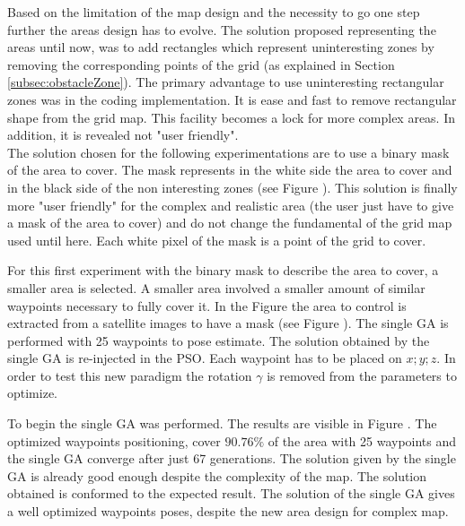 Based on the limitation of the map design and the necessity to go one step further the areas design has to evolve.
The solution proposed representing the areas until now, was to add rectangles which represent uninteresting zones by removing the corresponding points of the grid (as explained in Section \ref{subsec:obstacleZone}). The primary advantage to use uninteresting  rectangular zones was in the coding implementation. It is ease and fast to remove rectangular shape from the grid map. 
This facility becomes a lock for more complex areas. In addition, it is revealed not "user friendly".\\
 The solution chosen for the following experimentations are to use a binary mask of the area to cover. The mask represents in the white side the area to cover and in the black side of the non interesting zones (see Figure  ). This solution is finally more "user friendly" for the complex and realistic area (the user just have to give a mask of the area to cover) and do not change the fundamental of the grid map used until here. Each white pixel of the mask is a point of the grid to cover.  
 

For this first experiment with the binary mask to describe the area to cover, a smaller area is selected. A smaller area involved a smaller amount of similar waypoints necessary to fully cover it. In the Figure  the area to control is extracted from a satellite images to have a mask (see Figure ). The single GA is performed  with 25 waypoints to pose estimate. The solution obtained by the single GA is re-injected in the PSO. Each waypoint has to be placed on $x; y; z$. In order to test this new paradigm the rotation $\gamma$ is removed from the parameters to optimize.

 To begin the single GA was performed. The results are visible in Figure . The optimized waypoints positioning, cover $90.76\%$ of the area with 25 waypoints and the single GA converge after just 67 generations. The solution given by the single GA is already good enough despite the complexity of the map. 
  The solution obtained is conformed to the expected result. The solution of the single GA gives a well optimized waypoints poses, despite the new area design for complex map. 
  
